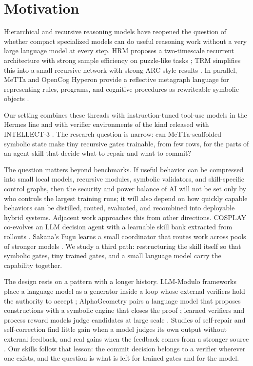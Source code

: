 \documentclass[11pt]{article}
\begin{document}
\section{Motivation}

Hierarchical and recursive reasoning models have reopened the question of whether compact specialized models can do useful reasoning work without a very large language model at every step. HRM proposes a two-timescale recurrent architecture with strong sample efficiency on puzzle-like tasks \citep{wang2025hrm}; TRM simplifies this into a small recursive network with strong ARC-style results \citep{jolicoeurmartineau2025trm}. In parallel, MeTTa and OpenCog Hyperon provide a reflective metagraph language for representing rules, programs, and cognitive procedures as rewriteable symbolic objects \citep{goertzel2021metta,meredith2023metametta}.

Our setting combines these threads with instruction-tuned tool-use models in the Hermes line \citep{teknium2024hermes3} and with verifier environments of the kind released with INTELLECT-3 \citep{primeintellect2025intellect3}. The research question is narrow: can MeTTa-scaffolded symbolic state make tiny recursive gates trainable, from few rows, for the parts of an agent skill that decide what to repair and what to commit?

The question matters beyond benchmarks. If useful behavior can be compressed into small local models, recursive modules, symbolic validators, and skill-specific control graphs, then the security and power balance of AI will not be set only by who controls the largest training runs; it will also depend on how quickly capable behaviors can be distilled, routed, evaluated, and recombined into deployable hybrid systems. Adjacent work approaches this from other directions. COSPLAY co-evolves an LLM decision agent with a learnable skill bank extracted from rollouts \citep{wu2026cosplay}. Sakana's Fugu learns a small coordinator that routes work across pools of stronger models \citep{sakana2026fugu}. We study a third path: restructuring the skill itself so that symbolic gates, tiny trained gates, and a small language model carry the capability together.

The design rests on a pattern with a longer history. LLM-Modulo frameworks place a language model as a generator inside a loop whose external verifiers hold the authority to accept \citep{kambhampati2024llmmodulo}; AlphaGeometry pairs a language model that proposes constructions with a symbolic engine that closes the proof \citep{trinh2024alphageometry}; learned verifiers and process reward models judge candidates at large scale \citep{cobbe2021verifiers,lightman2024verify}. Studies of self-repair and self-correction find little gain when a model judges its own output without external feedback, and real gains when the feedback comes from a stronger source \citep{olausson2024selfrepair,huang2024selfcorrect}. Our skills follow that lesson: the commit decision belongs to a verifier wherever one exists, and the question is what is left for trained gates and for the model.
\end{document}
